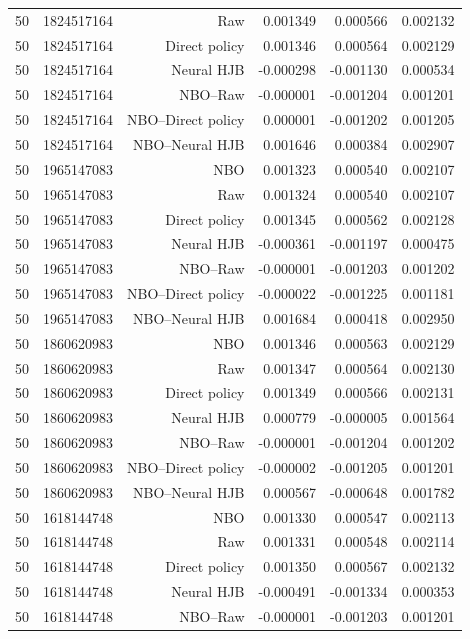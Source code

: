 \begin{longtable}{lrrrrr}
50 & 1824517164 & Raw & 0.001349 & 0.000566 & 0.002132 \\
50 & 1824517164 & Direct policy & 0.001346 & 0.000564 & 0.002129 \\
50 & 1824517164 & Neural HJB & -0.000298 & -0.001130 & 0.000534 \\
50 & 1824517164 & NBO--Raw & -0.000001 & -0.001204 & 0.001201 \\
50 & 1824517164 & NBO--Direct policy & 0.000001 & -0.001202 & 0.001205 \\
50 & 1824517164 & NBO--Neural HJB & 0.001646 & 0.000384 & 0.002907 \\
50 & 1965147083 & NBO & 0.001323 & 0.000540 & 0.002107 \\
50 & 1965147083 & Raw & 0.001324 & 0.000540 & 0.002107 \\
50 & 1965147083 & Direct policy & 0.001345 & 0.000562 & 0.002128 \\
50 & 1965147083 & Neural HJB & -0.000361 & -0.001197 & 0.000475 \\
50 & 1965147083 & NBO--Raw & -0.000001 & -0.001203 & 0.001202 \\
50 & 1965147083 & NBO--Direct policy & -0.000022 & -0.001225 & 0.001181 \\
50 & 1965147083 & NBO--Neural HJB & 0.001684 & 0.000418 & 0.002950 \\
50 & 1860620983 & NBO & 0.001346 & 0.000563 & 0.002129 \\
50 & 1860620983 & Raw & 0.001347 & 0.000564 & 0.002130 \\
50 & 1860620983 & Direct policy & 0.001349 & 0.000566 & 0.002131 \\
50 & 1860620983 & Neural HJB & 0.000779 & -0.000005 & 0.001564 \\
50 & 1860620983 & NBO--Raw & -0.000001 & -0.001204 & 0.001202 \\
50 & 1860620983 & NBO--Direct policy & -0.000002 & -0.001205 & 0.001201 \\
50 & 1860620983 & NBO--Neural HJB & 0.000567 & -0.000648 & 0.001782 \\
50 & 1618144748 & NBO & 0.001330 & 0.000547 & 0.002113 \\
50 & 1618144748 & Raw & 0.001331 & 0.000548 & 0.002114 \\
50 & 1618144748 & Direct policy & 0.001350 & 0.000567 & 0.002132 \\
50 & 1618144748 & Neural HJB & -0.000491 & -0.001334 & 0.000353 \\
50 & 1618144748 & NBO--Raw & -0.000001 & -0.001203 & 0.001201 \\

\end{longtable}
